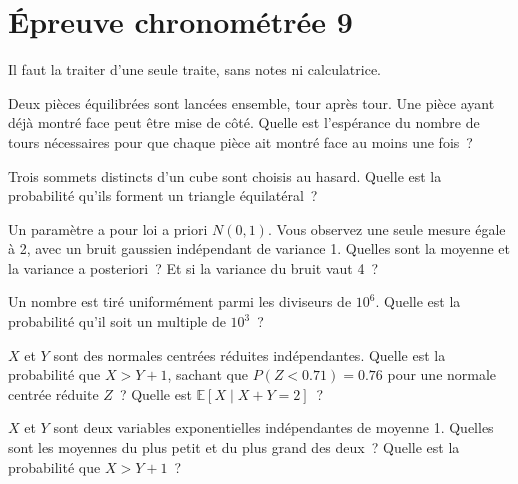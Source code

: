 \chapter{Épreuve chronométrée 9}\label{ch:iv1:timed-test-9}

\begin{ivtrains}
Il faut la traiter d'une seule traite, sans notes ni calculatrice.
\end{ivtrains}


\begin{question}\label{iq:iv1:timed-test-9:1}
Deux pièces équilibrées sont lancées ensemble, tour après tour. Une pièce ayant déjà montré face peut être mise de côté. Quelle est l'espérance du nombre de tours nécessaires pour que chaque pièce ait montré face au moins une fois~?
\end{question}

\begin{question}\label{iq:iv1:timed-test-9:2}
Trois sommets distincts d'un cube sont choisis au hasard. Quelle est la probabilité qu'ils forment un triangle équilatéral~?
\end{question}

\begin{question}\label{iq:iv1:timed-test-9:3}
Un paramètre a pour loi a priori $N(0, 1)$. Vous observez une seule mesure égale à 2, avec un bruit gaussien indépendant de variance 1. Quelles sont la moyenne et la variance a posteriori~? Et si la variance du bruit vaut 4~?
\end{question}

\begin{question}\label{iq:iv1:timed-test-9:4}
Un nombre est tiré uniformément parmi les diviseurs de $10^6$. Quelle est la probabilité qu'il soit un multiple de $10^3$~?
\end{question}

\begin{question}\label{iq:iv1:timed-test-9:5}
$X$ et $Y$ sont des normales centrées réduites indépendantes. Quelle est la probabilité que $X > Y + 1$, sachant que $P(Z < 0.71) = 0.76$ pour une normale centrée réduite $Z$~? Quelle est $\mathbb{E}[X \mid X + Y = 2]$~?
\end{question}

\begin{question}\label{iq:iv1:timed-test-9:6}
$X$ et $Y$ sont deux variables exponentielles indépendantes de moyenne 1. Quelles sont les moyennes du plus petit et du plus grand des deux~? Quelle est la probabilité que $X > Y + 1$~?
\end{question}

